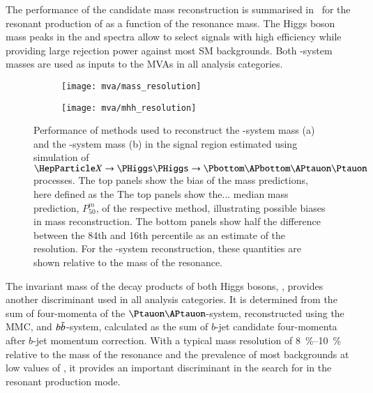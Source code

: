 The performance of the \PHiggs candidate mass reconstruction is
summarised in~ for the resonant
production of \HH as a function of the resonance mass. The Higgs boson
mass peaks in the \mMMC and \mBB spectra allow to select signals with
high efficiency while providing large rejection power against most SM
backgrounds. Both \PHiggs-system masses are used as inputs to the MVAs
in all analysis categories.

\begin{figure}[htbp]
  \centering

  \begin{subfigure}[t]{.5\textwidth}
    \centering
    \texttt{[image: mva/mass\_resolution]}
    \label{fig:mass_reconstruction_H}
  \end{subfigure}\hfill%
  \begin{subfigure}[t]{.5\textwidth}
    \centering
    \texttt{[image: mva/mhh\_resolution]}
    \label{fig:mass_reconstruction_HH}
  \end{subfigure}

  \caption{Performance of methods used to reconstruct the
    \PHiggs-system mass (a) and the \HH-system mass (b) in the \hadhad
    signal region estimated using simulation of
    $\PX \ra \HH \ra \bbtautau$ processes. The top panels show the
    bias of the mass predictions, here defined as the The top panels
    show the...  median mass prediction, $P_{50}^{m}$, of the
    respective method, illustrating possible biases in mass
    reconstruction.  The bottom panels show half the difference
    between the 84th and 16th percentile as an estimate of the
    resolution. For the \HH-system reconstruction, these quantities
    are shown relative to the mass of the resonance.}
  \label{fig:mass_reconstruction}
\end{figure}

The invariant mass of the decay products of both Higgs bosons, \mHH,
provides another discriminant used in all analysis categories. It is
determined from the sum of four-momenta of the
$\Ptauon\APtauon$-system, reconstructed using the MMC, and
$b\bar{b}$-system, calculated as the sum of $b$-jet candidate
four-momenta after $b$-jet momentum correction. With a typical mass
resolution of \SIrange{8}{10}{\percent} relative to the mass of the
resonance and the prevalence of most backgrounds at low values of
\mHH, it provides an important discriminant in the search for \HH in
the resonant production mode.


